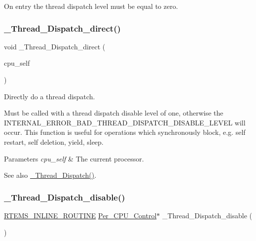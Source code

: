 On entry the thread dispatch level must be equal to zero. \mbox{\label{group__RTEMSScoreThread_gab4251559fe6a0c06762de333bca275f5}} 
\subsubsection{\texorpdfstring{\_Thread\_Dispatch\_direct()}{\_Thread\_Dispatch\_direct()}}
{\footnotesize\ttfamily void \+\_\+\+Thread\+\_\+\+Dispatch\+\_\+direct (\begin{DoxyParamCaption}\item[{\mbox{\hyperlink{structPer__CPU__Control}{Per\+\_\+\+C\+P\+U\+\_\+\+Control}} $\ast$}]{cpu\+\_\+self }\end{DoxyParamCaption})}



Directly do a thread dispatch. 

Must be called with a thread dispatch disable level of one, otherwise the I\+N\+T\+E\+R\+N\+A\+L\+\_\+\+E\+R\+R\+O\+R\+\_\+\+B\+A\+D\+\_\+\+T\+H\+R\+E\+A\+D\+\_\+\+D\+I\+S\+P\+A\+T\+C\+H\+\_\+\+D\+I\+S\+A\+B\+L\+E\+\_\+\+L\+E\+V\+EL will occur. This function is useful for operations which synchronously block, e.\+g. self restart, self deletion, yield, sleep.


\begin{DoxyParams}{Parameters}
{\em cpu\+\_\+self} & The current processor.\\
\hline
\end{DoxyParams}
\begin{DoxySeeAlso}{See also}
\mbox{\hyperlink{group__RTEMSScoreThread_ga14e949c0f400cda43b1e7547e50b088d}{\+\_\+\+Thread\+\_\+\+Dispatch()}}. 
\end{DoxySeeAlso}
\mbox{\label{group__RTEMSScoreThread_ga044bfb6e9317180d21b05c5338cedd1a}} 
\subsubsection{\texorpdfstring{\_Thread\_Dispatch\_disable()}{\_Thread\_Dispatch\_disable()}}
{\footnotesize\ttfamily \mbox{\hyperlink{group__RTEMSScoreBaseDefs_gac216239df231d5dbd15e3520b0b9313f}{R\+T\+E\+M\+S\+\_\+\+I\+N\+L\+I\+N\+E\+\_\+\+R\+O\+U\+T\+I\+NE}} \mbox{\hyperlink{structPer__CPU__Control}{Per\+\_\+\+C\+P\+U\+\_\+\+Control}}$\ast$ \+\_\+\+Thread\+\_\+\+Dispatch\+\_\+disable (\begin{DoxyParamCaption}\item[{void}]{ }\end{DoxyParamCaption})}



